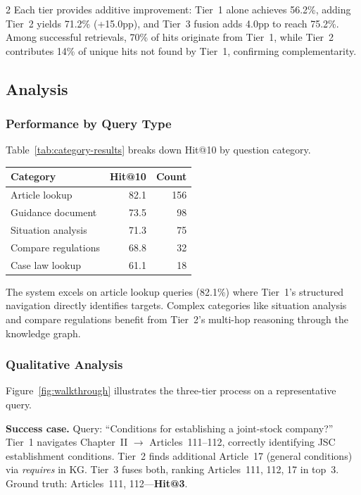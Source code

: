 \documentclass[11pt,a4paper]{article}
\begin{document}
\begin{multicols}{2}
Each tier provides additive improvement: Tier~1 alone achieves 56.2\%, adding Tier~2 yields 71.2\% (+15.0pp), and Tier~3 fusion adds 4.0pp to reach 75.2\%. Among successful retrievals, 70\% of hits originate from Tier~1, while Tier~2 contributes 14\% of unique hits not found by Tier~1, confirming complementarity.

\subsection{Analysis}

\subsubsection{Performance by Query Type}

Table~\ref{tab:category-results} breaks down Hit@10 by question category.

\vspace{0.3em}
\noindent
\centering\small
{}
\label{tab:category-results}
\begin{tabular}{lrr}
\toprule
\textbf{Category} & \textbf{Hit@10} & \textbf{Count} \\
\midrule
Article lookup & 82.1 & 156 \\
Guidance document & 73.5 & 98 \\
Situation analysis & 71.3 & 75 \\
Compare regulations & 68.8 & 32 \\
Case law lookup & 61.1 & 18 \\
\bottomrule
\end{tabular}
\normalsize
\justifying
\vspace{0.3em}

The system excels on article lookup queries (82.1\%) where Tier~1's structured navigation directly identifies targets. Complex categories like situation analysis and compare regulations benefit from Tier~2's multi-hop reasoning through the knowledge graph.

\subsubsection{Qualitative Analysis}

Figure~\ref{fig:walkthrough} illustrates the three-tier process on a representative query.

\textbf{Success case.} Query: ``Conditions for establishing a joint-stock company?'' Tier~1 navigates Chapter~II $\to$ Articles~111--112, correctly identifying JSC establishment conditions. Tier~2 finds additional Article~17 (general conditions) via \textit{requires} in KG. Tier~3 fuses both, ranking Articles~111, 112, 17 in top~3. Ground truth: Articles~111, 112---\textbf{Hit@3}.


\end{multicols}
\end{document}

